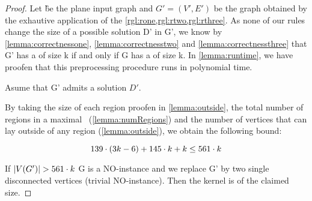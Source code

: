 \centraltheo*

\begin{proof}
    Let \G be the plane input graph and $G'=(V',E')$ be the graph obtained by the exhautive application of the \cref{rgl:rone,rgl:rtwo,rgl:rthree}. 
    As none of our rules change the size of a possible solution D' in G', we know by \cref{lemma:correctnessone}, \cref{lemma:correctnesstwo} and \cref{lemma:correctnessthree} that G' has a \sdom of size k if and only if G has a \sdom of size k.
    In \cref{lemma:runtime}, we have proofen that this preprocessing procedure runs in polynomial time.
    
    \noindent Asume that G' admits a solution $D'$. 
    
    
    By taking the size of each region proofen in \cref{lemma:outside}, the total number of regions in a maximal \dreg~(\cref{lemma:numRegions}) and the number of vertices that can lay outside of any region (\cref{lemma:outside}), we obtain the following bound:
    
    \begin{equation}
        139 \cdot (3k - 6) + 145 \cdot k + k \leq 561 \cdot k
    \end{equation}

    \noindent If $\abs{V(G')} > 561 \cdot k$ G is a NO-instance and we replace G' by two single disconnected vertices (trivial NO-instance). Then the kernel is of the claimed size.

\end{proof}